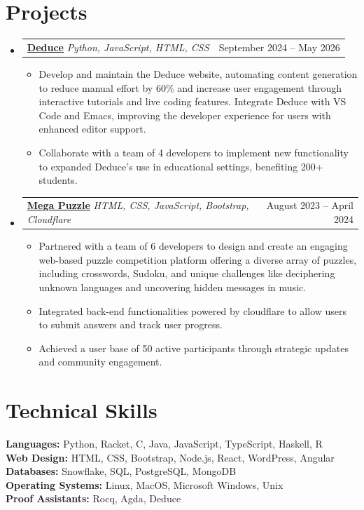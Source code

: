\documentclass[letterpaper,11pt]{article}
\makeatletter
\newcommand{\resumeItem}[1]{
  \item\small{
    {#1 \vspace{-2pt}}
  }
}
\newcommand{\flexText}[2]{
  \begin{tabular*}{1.0\textwidth}[t]{l@{\extracolsep{\fill}}r}
    #1 & #2 \\
  \end{tabular*}
}
\newcommand{\resumeProjectHeading}[2]{
    \item\flexText{{\small#1}}{{\small#2}}
}
\newcommand{\resumeSubHeadingListStart}{\begin{itemize}[leftmargin=0in, label={}]}
\newcommand{\resumeSubHeadingListEnd}{\end{itemize}\vspace{-9pt}}
\newcommand{\resumeItemListStart}{\vspace{-2pt}\begin{itemize}[leftmargin=0.3in]}
\newcommand{\resumeItemListEnd}{\end{itemize}\vspace{-5pt}}
\makeatother
\begin{document}
\section{Projects}
\resumeSubHeadingListStart
\resumeProjectHeading
{\textbf{\href{https://github.com/jsiek/deduce}{Deduce}} \textbar{} \emph{Python, JavaScript, HTML, CSS}}{September 2024 -- May 2026}
\vspace{-18pt}
{\small \resumeItemListStart
\resumeItem{Develop and maintain the Deduce website, automating content generation to reduce  manual effort by 60\% and increase user engagement through interactive tutorials and  live coding features. Integrate Deduce with VS Code and Emacs, improving the developer  experience for users with enhanced editor support.}
\resumeItem{Collaborate with a team of 4 developers to implement new functionality to expanded Deduce’s use in educational settings, benefiting 200+ students.}
\resumeItemListEnd}
\resumeProjectHeading
{\textbf{\href{https://github.com/Luddy-LLC/MegaPuzzle2024}{Mega Puzzle}} \textbar{} \emph{HTML, CSS, JavaScript, Bootstrap, Cloudflare}}{August 2023 -- April 2024}
\vspace{-18pt}
{\small \resumeItemListStart
\resumeItem{Partnered with a team of 6 developers to design and create an engaging  web-based puzzle competition platform offering a diverse array of puzzles,  including crosswords, Sudoku, and unique challenges like deciphering unknown  languages and uncovering hidden messages in music.}
\resumeItem{Integrated back-end functionalities powered by cloudflare to allow users to  submit answers and track user progress.}
\resumeItem{Achieved a user base of 50 active participants through strategic  updates and community engagement.}
\resumeItemListEnd}
\resumeSubHeadingListEnd

\section{Technical Skills}
\begin{itemize}[leftmargin=0in, label={}]
\small{\item{\textbf{Languages:} Python, Racket, C, Java, JavaScript, TypeScript, Haskell, R \\
\textbf{Web Design:} HTML, CSS, Bootstrap, Node.js, React, WordPress, Angular \\
\textbf{Databases:} Snowflake, SQL, PostgreSQL, MongoDB \\
\textbf{Operating Systems:} Linux, MacOS, Microsoft Windows, Unix \\
\textbf{Proof Assistants:} Rocq, Agda, Deduce}}
\end{itemize}




\end{document}
